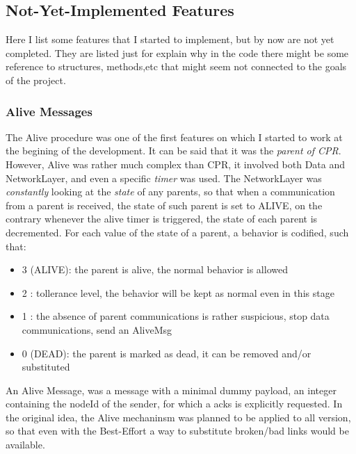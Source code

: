 \documentclass{article}
\begin{document}
\subsection{Not-Yet-Implemented Features}
Here I list some features that I started to implement, but by now are not yet completed. They are listed just for explain why in the code there might be some reference to structures, methods,etc that might seem not connected to the goals of the project.
\subsubsection{Alive Messages}
The Alive procedure was one of the first features on which I started to work at the begining of the development. It can be said that it was the \emph{parent of CPR}. However, Alive was rather much complex than CPR, it involved both Data and NetworkLayer, and even a specific \textit{timer} was used. The NetworkLayer was \textit{constantly} looking at the \emph{state} of any parents, so that when a communication from a parent is received, the state of such parent is set to ALIVE, on the contrary whenever the alive timer is triggered, the state of each parent is decremented. For each value of the state of a parent, a behavior is codified, such that:
\begin{itemize}
	\item 3 (ALIVE): the parent is alive, the normal behavior is allowed
	\item 2 : tollerance level, the behavior will be  kept as normal even in this stage
	\item 1 : the absence of parent communications is rather suspicious, stop data communications, send an AliveMsg
	\item 0 (DEAD): the parent is marked as dead, it can be removed and/or substituted
\end{itemize}
An Alive Message, was a message with a minimal dummy payload, an integer containing the nodeId of the sender, for which a acks is explicitly requested. In the original idea, the Alive mechaninsm was planned to be applied to all version, so that even with the Best-Effort a way to substitute broken/bad links would be available.
\end{document}
